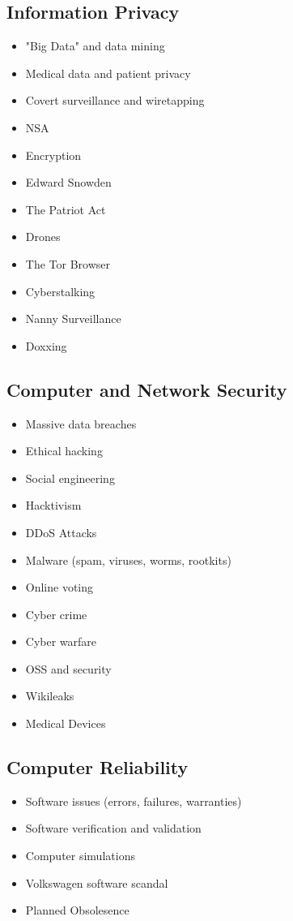 \documentclass[12pt,a4paper]{report}
\begin{document}
\subsection*{Information Privacy}
\begin{itemize}
\item "Big Data" and data mining
\item Medical data and patient privacy
\item Covert surveillance and wiretapping
\item NSA
\item Encryption
\item Edward Snowden
\item The Patriot Act
\item Drones
\item The Tor Browser
\item Cyberstalking
\item Nanny Surveillance
\item Doxxing
\end{itemize}

\subsection*{Computer and Network Security}
\begin{itemize}
\item Massive data breaches
\item Ethical hacking
\item Social engineering
\item Hacktivism
\item DDoS Attacks
\item Malware (spam, viruses, worms, rootkits)
\item Online voting
\item Cyber crime
\item Cyber warfare
\item OSS and security
\item Wikileaks
\item Medical Devices
\end{itemize}

\subsection*{Computer Reliability}
\begin{itemize}
\item Software issues (errors, failures, warranties)
\item Software verification and validation
\item Computer simulations
\item Volkswagen software scandal
\item Planned Obsolesence
\end{itemize}
\end{document}
